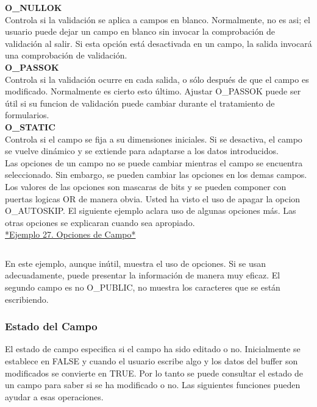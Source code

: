 \documentclass{article}
\begin{document}
\textbf{O\_NULLOK}\\
Controla si la validación se aplica a campos en blanco. Normalmente, no es asi;
el usuario puede dejar un campo en blanco sin invocar la comprobación de
validación al salir. Si esta opción está desactivada en un campo, la salida
invocará una comprobación de validación.\\

\textbf{O\_PASSOK}\\
Controla si la validación ocurre en cada salida, o sólo después de que el campo
es modificado. Normalmente es cierto esto último. Ajustar O\_PASSOK puede ser
útil si su funcion de validación puede cambiar durante el tratamiento de
formularios.\\

\textbf{O\_STATIC}\\
Controla si el campo se fija a su dimensiones iniciales. Si se desactiva, el
campo se vuelve dinámico y se extiende para adaptarse a los datos
introducidos.\\

Las opciones de un campo no se puede cambiar mientras el campo se encuentra
seleccionado. Sin embargo, se pueden cambiar las opciones en los demas campos.\\

Los valores de las opciones son mascaras de bits y se pueden componer con
puertas logicas OR de manera obvia. Usted ha visto el uso de apagar la opcion
O\_AUTOSKIP. El siguiente ejemplo aclara uso de algunas opciones más. Las otras
opciones se explicaran cuando sea apropiado.\\

\href{https://github.com/nasciiboy/NCURSES-Programming-HOWTO/blob/master/ncurses_programs/forms/form_options.c}{*Ejemplo 27. Opciones de Campo*}
\inputminted{cpp}{./cpp/027_opciones_campo.cpp}


En este ejemplo, aunque inútil, muestra el uso de opciones. Si se usan
adecuadamente, puede presentar la información de manera muy eficaz. El segundo
campo es no O\_PUBLIC, no muestra los caracteres que se están escribiendo.

\subsubsection{Estado del Campo}%
El estado de campo especifica si el campo ha sido editado o no. Inicialmente se
establece en FALSE y cuando el usuario escribe algo y los datos del buffer son
modificados se convierte en TRUE. Por lo tanto se puede consultar el estado de
un campo para saber si se ha modificado o no. Las siguientes funciones pueden
ayudar a esas operaciones.\\
\end{document}
